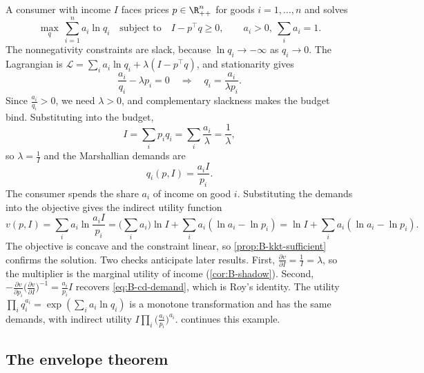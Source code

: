 \begin{example}\label{ex:B-cobb-douglas}
A consumer with income $I$ faces prices $p \in \R^n_{++}$ for goods $i = 1, \dots, n$ and solves
\begin{equation*}
\max_q\ \sum_{i = 1}^{n}a_i\ln q_i \quad\text{subject to}\quad I - p^\top q \geq 0 , \qquad a_i > 0,\ \sum_i a_i = 1 .
\end{equation*}
The nonnegativity constraints are slack, because $\ln q_i \to -\infty$ as $q_i \to 0$. The Lagrangian is
$\mathcal{L} = \sum_i a_i\ln q_i + \lambda(I - p^\top q)$, and stationarity gives
\begin{equation*}
\frac{a_i}{q_i} - \lambda p_i = 0 \quad\Longrightarrow\quad q_i = \frac{a_i}{\lambda p_i} .
\end{equation*}
Since $\frac{a_i}{q_i} > 0$, we need $\lambda > 0$, and complementary slackness makes the budget bind. Substituting into
the budget,
\begin{equation*}
I = \sum_i p_iq_i = \sum_i\frac{a_i}{\lambda} = \frac{1}{\lambda} ,
\end{equation*}
so $\lambda = \frac{1}{I}$ and the Marshallian demands are
\begin{equation}\label{eq:B-cd-demand}
q_i(p, I) = \frac{a_iI}{p_i} .
\end{equation}
The consumer spends the share $a_i$ of income on good $i$. Substituting the demands into the objective gives the
indirect utility function
\begin{equation}\label{eq:B-cd-indirect}
v(p, I) = \sum_i a_i\ln\frac{a_iI}{p_i} = \Big(\sum_i a_i\Big)\ln I + \sum_i a_i(\ln a_i - \ln p_i)
= \ln I + \sum_i a_i(\ln a_i - \ln p_i) .
\end{equation}
The objective is concave and the constraint linear, so \cref{prop:B-kkt-sufficient} confirms the solution. Two checks
anticipate later results. First, $\frac{\partial v}{\partial I} = \frac{1}{I} = \lambda$, so the multiplier is the marginal
utility of income (\cref{cor:B-shadow}). Second, $-\frac{\partial v}{\partial p_i}\big(\frac{\partial v}{\partial I}\big)^{-1} = \frac{a_i}{p_i}I$
recovers \eqref{eq:B-cd-demand}, which is Roy's identity. The utility $\prod_iq_i^{a_i} = \exp(\sum_ia_i\ln q_i)$ is a monotone
transformation and has the same demands, with indirect utility $I\prod_i\big(\frac{a_i}{p_i}\big)^{a_i}$.
 continues this example.
\end{example}

\subsection{The envelope theorem}\label{sec:B-envelope-thm}

